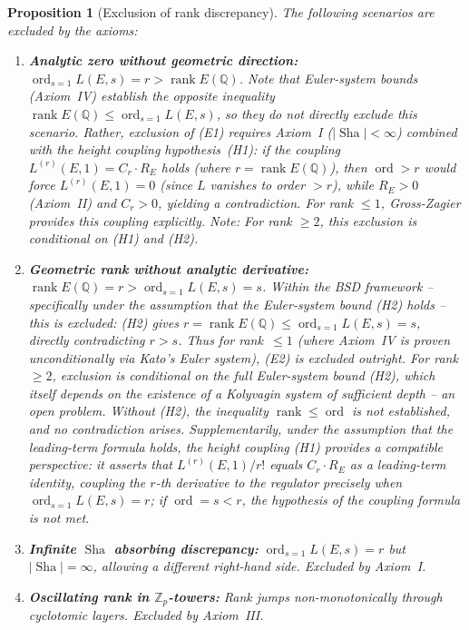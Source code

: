 \documentclass[aps,prd,twocolumn,superscriptaddress,nofootinbib]{revtex4-2}
\newtheorem{proposition}[theorem]{Proposition}
\theoremstyle{definition}
\theoremstyle{remark}
\DeclareMathOperator{\ord}{ord}
\DeclareMathOperator{\rank}{rank}
\DeclareMathOperator{\Sha}{Sha}
\begin{document}
\begin{proposition}[Exclusion of rank discrepancy]
\label{prop:exclusion}
The following scenarios are excluded by the axioms:

\begin{enumerate}
\item[\textbf{(E1)}] \textbf{Analytic zero without geometric direction:} $\ord_{s=1} L(E,s) = r > \rank E(\mathbb{Q})$. Note that Euler-system bounds (Axiom~IV) establish the \textit{opposite} inequality $\rank E(\mathbb{Q}) \leq \ord_{s=1} L(E,s)$, so they do not directly exclude this scenario. Rather, exclusion of (E1) requires Axiom~I ($|\Sha| < \infty$) combined with the height coupling hypothesis~(H1): if the coupling $L^{(r)}(E,1) = C_r \cdot R_E$ holds (where $r = \rank E(\mathbb{Q})$), then $\ord > r$ would force $L^{(r)}(E,1) = 0$ (since $L$ vanishes to order $> r$), while $R_E > 0$ (Axiom~II) and $C_r > 0$, yielding a contradiction. For rank $\leq 1$, Gross-Zagier provides this coupling explicitly. \textit{Note:} For rank $\geq 2$, this exclusion is conditional on (H1) and (H2).

\item[\textbf{(E2)}] \textbf{Geometric rank without analytic derivative:} $\rank E(\mathbb{Q}) = r > \ord_{s=1} L(E,s) = s$. \textit{Within the BSD framework} -- specifically under the assumption that the Euler-system bound (H2) holds -- this is excluded: (H2) gives $r = \rank E(\mathbb{Q}) \leq \ord_{s=1} L(E,s) = s$, directly contradicting $r > s$. Thus for rank~$\leq 1$ (where Axiom~IV is proven unconditionally via Kato's Euler system), (E2) is excluded outright. For rank~$\geq 2$, exclusion is conditional on the full Euler-system bound (H2), which itself depends on the existence of a Kolyvagin system of sufficient depth -- an open problem. Without (H2), the inequality $\rank \leq \ord$ is not established, and no contradiction arises. Supplementarily, under the assumption that the leading-term formula holds, the height coupling (H1) provides a compatible perspective: it asserts that $L^{(r)}(E,1)/r!$ equals $C_r \cdot R_E$ as a \textit{leading-term identity}, coupling the $r$-th derivative to the regulator precisely when $\ord_{s=1} L(E,s) = r$; if $\ord = s < r$, the hypothesis of the coupling formula is not met.

\item[\textbf{(E3)}] \textbf{Infinite $\Sha$ absorbing discrepancy:} $\ord_{s=1} L(E,s) = r$ but $|\Sha| = \infty$, allowing a different right-hand side. Excluded by Axiom~I.

\item[\textbf{(E4)}] \textbf{Oscillating rank in $\mathbb{Z}_p$-towers:} Rank jumps non-monotonically through cyclotomic layers. Excluded by Axiom~III.
\end{enumerate}
\end{proposition}
\end{document}

